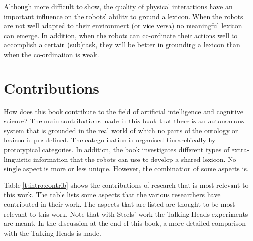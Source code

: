 Although more difficult to show, the quality of physical interactions have an important influence on the robots' ability to ground a lexicon. When the robots are not well adapted to their environment (or vice versa) no meaningful lexicon can emerge. In addition, when the robots can co-ordinate their actions well to accomplish a certain (sub)task, they will be better in grounding a lexicon than when the co-ordination is weak.

\section{Contributions}

How does this book contribute to the field of artificial intelligence and cognitive science? The main contributions made in this book that there is an autonomous system that is grounded in the real world of which no parts of the ontology or lexicon is pre-defined. The categorisation is organised hierarchically by prototypical categories. In addition, the book investigates different types of extra-linguistic information that the robots can use to develop a shared lexicon. No single aspect is more or less unique. However, the combination of some aspects is.

Table \ref{t:intro:contrib} shows the contributions of research that is most relevant to this work. The table lists some aspects that the various researchers have contributed in their work. The aspects that are listed are thought to be most relevant to this work. Note that with Steels' work the Talking Heads experiments are meant. In the discussion at the end of this book, a more detailed comparison with the Talking Heads is made.

